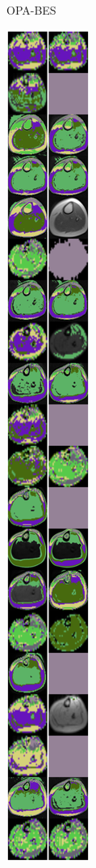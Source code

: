 \documentclass[conference]{IEEEtran}
\begin{document}
\begin{figure}[!htb]
\begin{subfigure}[b]{0.13\textwidth}
		\caption{OPA-BES}
		\label{fig:imagen2}
	\end{subfigure}
	\begin{subfigure}[b]{0.13\textwidth}
		\includegraphics[width=\textwidth]{Umbrales/kapur/Dim7/HHO_TSO_Dim7_Kapur.png}

\end{subfigure}
\end{figure}
\end{document}
